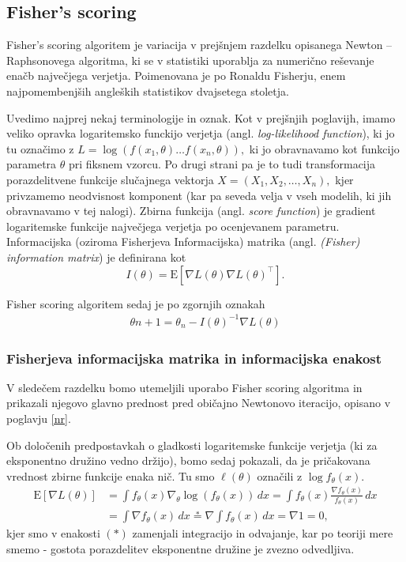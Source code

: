 \documentclass[12pt,a4paper]{amsart}
\theoremstyle{definition} %
\theoremstyle{plain} %
\begin{document}
\subsection{Fisher's scoring}
Fisher's scoring algoritem je variacija v prejšnjem razdelku opisanega Newton -- Raphsonovega algoritma, ki se v statistiki uporablja za numerično reševanje enačb največjega 
verjetja. Poimenovana je po Ronaldu Fisherju, enem najpomembenjših angleških statistikov dvajsetega stoletja.

Uvedimo najprej nekaj terminologije in oznak. Kot v prejšnjih poglavijh, imamo veliko opravka logaritemsko funckijo verjetja (angl. \textit{log-likelihood function}), ki jo tu označimo 
z $L = \log \left(f(x_{1},\theta)\ldots f(x_{n},\theta) \right),$ ki jo obravnavamo kot funkcijo parametra $\theta$ pri fiksnem vzorcu. Po drugi strani pa je to
tudi transformacija porazdelitvene funkcije slučajnega vektorja $X = (X_{1},X_{2},\ldots,X_{n}),$ kjer privzamemo neodvisnost komponent (kar pa seveda velja v vseh
modelih, ki jih obravnavamo v tej nalogi). Zbirna funkcija (angl. \textit{score function}) je gradient logaritemske funkcije največjega verjetja po ocenjevanem parametru. 
Informacijska (oziroma Fisherjeva Informacijska) matrika (angl. \textit{(Fisher) information matrix}) je definirana kot 
\[
    I(\theta) = \mathrm{E}[\nabla L(\theta) \nabla L(\theta)^\top ]. %
\]

Fisher scoring algoritem sedaj je po zgornjih oznakah 
\begin{align}
    \theta{n + 1} = \theta_{n} - I(\theta)^{-1}\nabla L(\theta)
\end{align}

\subsubsection{Fisherjeva informacijska matrika in informacijska enakost}
V sledečem razdelku bomo utemeljili uporabo Fisher scoring algoritma in prikazali njegovo glavno prednost pred običajno Newtonovo iteracijo, opisano v poglavju \ref{nr}.

Ob določenih predpostavkah o gladkosti logaritemske funkcije verjetja (ki za eksponentno družino vedno držijo), bomo sedaj pokazali, da je pričakovana vrednost
zbirne funkcije enaka nič. Tu smo $\ell(\theta)$ označili z $\log f_{\theta}(x)$.
\begin{align} \label{Ezbirne}
    \mathrm{E}[\nabla L (\theta)] &= \int f_{\theta}(x) \nabla_{\theta}\log(f_{\theta}(x)) \,dx = \int f_{\theta}(x) \frac{\nabla f_{\theta}(x)}{f_{\theta}(x)} \,dx \nonumber \\
        &= \int \nabla f_{\theta}(x) \,dx \overset{*}{=} \nabla \int f_{\theta}(x) \,dx = \nabla 1 = 0, 
\end{align}
kjer smo v enakosti $(*)$ zamenjali integracijo in odvajanje, kar po teoriji mere smemo - gostota porazdelitev eksponentne družine je zvezno odvedljiva. 
\end{document}
